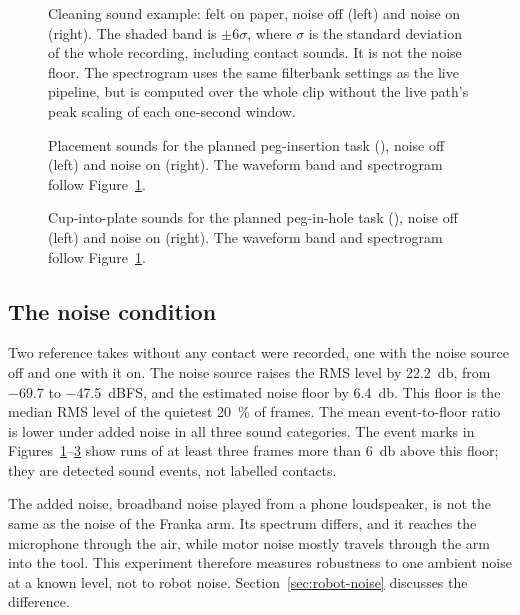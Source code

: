 \documentclass[
  english,
  accentcolor=11b,
  type=intern,
  marginpar=false,
  logofile=figures/PEARLTUDA.png
]{tudapub}
\DeclareRobustCommand{\code}[1]{\texttt{\detokenize{#1}}}
\begin{document}
\begin{figure}[htbp]
  \centering
  \resizebox{\textwidth}{!}{}
  \caption{Cleaning sound example: felt on paper, noise off (left) and noise on (right). The shaded band is \(\pm6\sigma\), where \(\sigma\) is the standard deviation of the whole recording, including contact sounds. It is not the noise floor. The spectrogram uses the same filterbank settings as the live pipeline, but is computed over the whole clip without the live path's peak scaling of each one-second window.}
  \label{fig:home-panels-clean}
\end{figure}

\begin{figure}[htbp]
  \centering
  \resizebox{\textwidth}{!}{}
  \caption{Placement sounds for the planned peg-insertion task (\code{put_sizes}), noise off (left) and noise on (right). The waveform band and spectrogram follow Figure~\ref{fig:home-panels-clean}.}
  \label{fig:home-panels-sizes}
\end{figure}

\begin{figure}[htbp]
  \centering
  \resizebox{\textwidth}{!}{}
  \caption{Cup-into-plate sounds for the planned peg-in-hole task (\code{red_green}), noise off (left) and noise on (right). The waveform band and spectrogram follow Figure~\ref{fig:home-panels-clean}.}
  \label{fig:home-panels-insert}
\end{figure}

\subsection{The noise condition}
\label{sec:noise-condition}

Two reference takes without any contact were recorded, one with the noise source off and one with it on. The noise source raises the RMS level by \SI{22.2}{\decibel}, from \SI{-69.7}{} to \SI{-47.5}{dBFS}, and the estimated noise floor by \SI{6.4}{\decibel}. This floor is the median RMS level of the quietest \SI{20}{\percent} of frames. The mean event-to-floor ratio is lower under added noise in all three sound categories. The event marks in Figures~\ref{fig:home-panels-clean}--\ref{fig:home-panels-insert} show runs of at least three frames more than \SI{6}{\decibel} above this floor; they are detected sound events, not labelled contacts.

The added noise, broadband noise played from a phone loudspeaker, is not the same as the noise of the Franka arm. Its spectrum differs, and it reaches the microphone through the air, while motor noise mostly travels through the arm into the tool. This experiment therefore measures robustness to one ambient noise at a known level, not to robot noise. Section~\ref{sec:robot-noise} discusses the difference.
\end{document}
